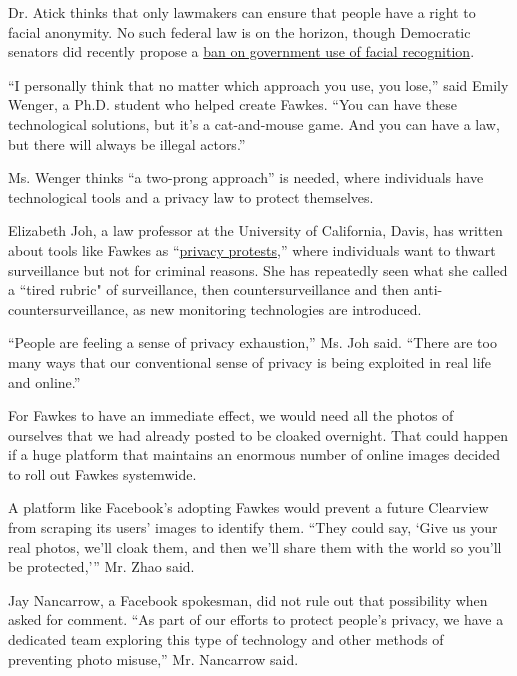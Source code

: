 Dr. Atick thinks that only lawmakers can ensure that people have a right
to facial anonymity. No such federal law is on the horizon, though
Democratic senators did recently propose a
\href{https://www.markey.senate.gov/news/press-releases/senators-markey-and-merkley-and-reps-jayapal-pressley-to-introduce-legislation-to-ban-government-use-of-facial-recognition-other-biometric-technology}{ban
on government use of facial recognition}.

``I personally think that no matter which approach you use, you lose,''
said Emily Wenger, a Ph.D. student who helped create Fawkes. ``You can
have these technological solutions, but it's a cat-and-mouse game. And
you can have a law, but there will always be illegal actors.''

Ms. Wenger thinks ``a two-prong approach'' is needed, where individuals
have technological tools and a privacy law to protect themselves.

Elizabeth Joh, a law professor at the University of California, Davis,
has written about tools like Fawkes as
``\href{https://papers.ssrn.com/sol3/papers.cfm?abstract_id=2285095}{privacy
protests},'' where individuals want to thwart surveillance but not for
criminal reasons. She has repeatedly seen what she called a ``tired
rubric" of surveillance, then countersurveillance and then
anti-countersurveillance, as new monitoring technologies are introduced.

``People are feeling a sense of privacy exhaustion,'' Ms. Joh said.
``There are too many ways that our conventional sense of privacy is
being exploited in real life and online.''

For Fawkes to have an immediate effect, we would need all the photos of
ourselves that we had already posted to be cloaked overnight. That could
happen if a huge platform that maintains an enormous number of online
images decided to roll out Fawkes systemwide.

A platform like Facebook's adopting Fawkes would prevent a future
Clearview from scraping its users' images to identify them. ``They could
say, `Give us your real photos, we'll cloak them, and then we'll share
them with the world so you'll be protected,''' Mr. Zhao said.

Jay Nancarrow, a Facebook spokesman, did not rule out that possibility
when asked for comment. ``As part of our efforts to protect people's
privacy, we have a dedicated team exploring this type of technology and
other methods of preventing photo misuse,'' Mr. Nancarrow said.

